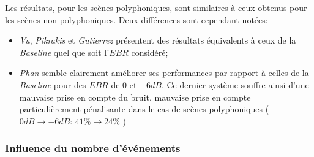 Les résultats, pour les scènes polyphoniques, sont similaires à ceux obtenus pour les scènes non-polyphoniques. Deux différences sont cependant notées:

\begin{itemize}
\item  \emph{Vu}, \emph{Pikrakis} et \emph{Gutierrez} présentent des résultats équivalents à ceux de la \emph{Baseline} quel que soit l'$EBR$ considéré;
\item  \emph{Phan} semble clairement améliorer ses performances par rapport à celles de la \emph{Baseline} pour des $EBR$ de $0$ et $+6dB$. Ce dernier système souffre ainsi d'une mauvaise prise en compte du bruit, mauvaise prise en compte particulièrement pénalisante dans le cas de scènes polyphoniques ($0dB\rightarrow -6dB$: $41\%\rightarrow 24\%$ )
\end{itemize}

\subsubsection{Influence du nombre d'événements}

